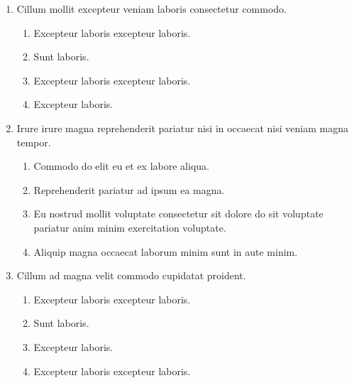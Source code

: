 \documentclass[a4paper,12pt]{article}
\begin{document}
\begin{enumerate}[label=\textbf{\arabic*.}]
\begin{multicols}{2}
\end{multicols}
\item Cillum mollit excepteur veniam laboris consectetur commodo.
\begin{multicols}{2}
	\begin{enumerate}
		\item  Excepteur laboris excepteur laboris.
  
		\item  Sunt laboris.
    
		\item  Excepteur laboris excepteur laboris.
    
		\item  Excepteur laboris.
    
	\end{enumerate}

\end{multicols}
\item Irure irure magna reprehenderit pariatur nisi in occaecat nisi veniam magna tempor.
\begin{multicols}{2}
	\begin{enumerate}
		\item  Commodo do elit eu et ex labore aliqua.
    
		\item  Reprehenderit pariatur ad ipsum ea magna.
  
		\item  Eu nostrud mollit voluptate consectetur sit dolore do sit voluptate pariatur anim minim exercitation voluptate.
    
		\item  Aliquip magna occaecat laborum minim sunt in aute minim.
    
	\end{enumerate}

\end{multicols}
\item Cillum ad magna velit commodo cupidatat proident.
\begin{multicols}{2}
	\begin{enumerate}
		\item  Excepteur laboris excepteur laboris.
    
		\item  Sunt laboris.
    
		\item  Excepteur laboris.
    
		\item  Excepteur laboris excepteur laboris.
  

\end{enumerate}
\end{multicols}
\end{enumerate}
\end{document}
